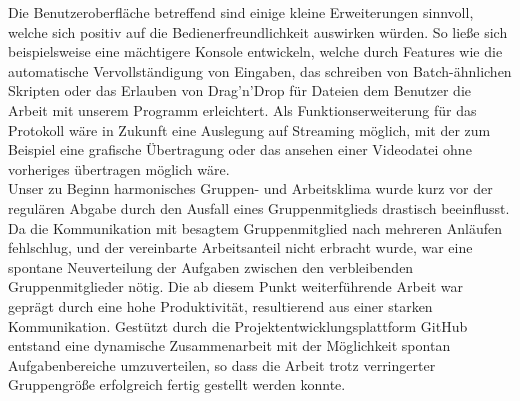 Die Benutzeroberfläche betreffend sind einige kleine Erweiterungen sinnvoll, welche sich positiv auf die Bedienerfreundlichkeit auswirken würden. 
So ließe sich beispielsweise eine mächtigere Konsole entwickeln, welche durch Features wie die automatische Vervollständigung von Eingaben, das schreiben von Batch-ähnlichen Skripten oder das Erlauben von Drag’n’Drop für Dateien dem Benutzer die Arbeit mit unserem Programm erleichtert.
Als Funktionserweiterung für das Protokoll wäre in Zukunft eine Auslegung auf Streaming möglich, mit der zum Beispiel eine grafische Übertragung oder das ansehen einer Videodatei ohne vorheriges übertragen möglich wäre.\\ 
Unser zu Beginn harmonisches Gruppen- und Arbeitsklima wurde kurz vor der regulären Abgabe durch den Ausfall eines Gruppenmitglieds drastisch beeinflusst. 
Da die Kommunikation mit besagtem Gruppenmitglied nach mehreren Anläufen fehlschlug, und der vereinbarte Arbeitsanteil nicht erbracht wurde, war eine spontane Neuverteilung der Aufgaben zwischen den verbleibenden Gruppenmitglieder nötig. 
Die ab diesem Punkt weiterführende Arbeit war geprägt durch eine hohe Produktivität, resultierend aus einer starken Kommunikation.
Gestützt durch die Projektentwicklungsplattform GitHub entstand eine dynamische Zusammenarbeit mit der Möglichkeit spontan Aufgabenbereiche umzuverteilen, so dass die Arbeit trotz verringerter Gruppengröße erfolgreich fertig gestellt werden konnte.
%